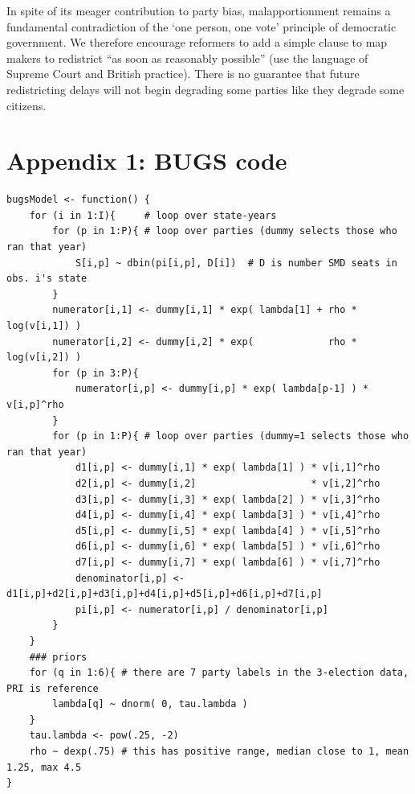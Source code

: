 \documentclass[letter,12pt]{article}
\begin{document}
In spite of its meager contribution to party bias, malapportionment remains a fundamental contradiction of the `one person, one vote' principle of democratic government. We therefore encourage reformers to add a simple clause to map makers to redistrict ``as soon as reasonably possible'' (use the language of Supreme Court and British practice). There is no guarantee that future redistricting delays will not begin degrading some parties like they degrade some citizens. 

\section*{Appendix 1: BUGS code}

\singlespacing

\begin{scriptsize}
\begin{verbatim}
bugsModel <- function() {
    for (i in 1:I){     # loop over state-years
        for (p in 1:P){ # loop over parties (dummy selects those who ran that year) 
            S[i,p] ~ dbin(pi[i,p], D[i])  # D is number SMD seats in obs. i's state
        }
        numerator[i,1] <- dummy[i,1] * exp( lambda[1] + rho * log(v[i,1]) )
        numerator[i,2] <- dummy[i,2] * exp(             rho * log(v[i,2]) )
        for (p in 3:P){
            numerator[i,p] <- dummy[i,p] * exp( lambda[p-1] ) * v[i,p]^rho
        }
        for (p in 1:P){ # loop over parties (dummy=1 selects those who ran that year) 
            d1[i,p] <- dummy[i,1] * exp( lambda[1] ) * v[i,1]^rho 
            d2[i,p] <- dummy[i,2]                    * v[i,2]^rho 
            d3[i,p] <- dummy[i,3] * exp( lambda[2] ) * v[i,3]^rho 
            d4[i,p] <- dummy[i,4] * exp( lambda[3] ) * v[i,4]^rho 
            d5[i,p] <- dummy[i,5] * exp( lambda[4] ) * v[i,5]^rho 
            d6[i,p] <- dummy[i,6] * exp( lambda[5] ) * v[i,6]^rho 
            d7[i,p] <- dummy[i,7] * exp( lambda[6] ) * v[i,7]^rho 
            denominator[i,p] <- d1[i,p]+d2[i,p]+d3[i,p]+d4[i,p]+d5[i,p]+d6[i,p]+d7[i,p]
            pi[i,p] <- numerator[i,p] / denominator[i,p]
        }
    }
    ### priors
    for (q in 1:6){ # there are 7 party labels in the 3-election data, PRI is reference
        lambda[q] ~ dnorm( 0, tau.lambda )
    }
    tau.lambda <- pow(.25, -2)
    rho ~ dexp(.75) # this has positive range, median close to 1, mean 1.25, max 4.5
}
\end{verbatim}
\end{scriptsize}

\onehalfspacing



%


\end{document}
